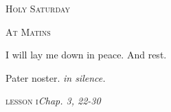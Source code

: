 ﻿%
\vspace*{-50pt plus 20pt}
\begin{center}{%
\huge \textsc{Holy Saturday}

\bigskip
\normalsize\textsc{At Matins}
}\end{center}


\def\officehour{Matins}
\def\matinsnocturn{1st Nocturn}
%
\large
\def\preant{\setgrefactor{17}\large}
\def\prepsalm{\normalsize\greblockcustos}
\def\anttranslation{In peace in the selfsame, I will both sleep and rest.}
\def\psalmtranslationsmall{T}
\let\prepsalm=\undefined
%
\def\preant{\setgrefactor{17}\large}
\def\prepsalm{\normalsize\greblockcustos}
\def\psalmtranslationsmall{T}
\def\anttranslation{He shall abide in thy tabernacle: he shall dwell on thy holy hill.}
\let\prepsalm=\undefined
\bigskip
%
\def\preant{\setgrefactor{17}\large}
\def\psalmtranslationsmall{T}
\def\anttranslation{My flesh shall rest in hope.}
\def\prepsalm{\normalsize}
\let\prepsalm=\undefined

\bigskip
{}
{I will lay me down in peace.}
{And rest.}

\bigskip
Pater noster. \emph{in silence.}

\medskip
\hspace{10ex}\textsc{lesson i}\hfill\emph{Chap. 3, 22-30}\hspace{10ex}

